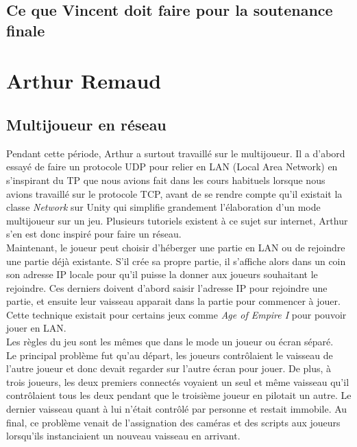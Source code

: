 \documentclass[10pt, titlepage]{report}
\begin{document}
\subsection{Ce que Vincent doit faire pour la soutenance finale}

\section{Arthur Remaud}

\subsection{Multijoueur en réseau}
Pendant cette période, Arthur a surtout travaillé sur le multijoueur. Il a d'abord essayé de faire un protocole UDP pour relier en LAN (Local Area Network) en s'inspirant du TP que nous avions fait dans les cours habituels lorsque nous avions travaillé sur le protocole TCP, avant de se rendre compte qu'il existait la classe \textit{Network} sur Unity qui simplifie grandement l'élaboration d'un mode multijoueur sur un jeu. Plusieurs tutoriels existent à ce sujet sur internet, Arthur s'en est donc inspiré pour faire un réseau.\\

Maintenant, le joueur peut choisir d'héberger une partie en LAN ou de rejoindre une partie déjà existante. S'il crée sa propre partie, il s'affiche alors dans un coin son adresse IP locale pour qu'il puisse la donner aux joueurs souhaitant le rejoindre. Ces derniers doivent d'abord saisir l'adresse IP pour rejoindre une partie, et ensuite leur vaisseau apparait dans la partie pour commencer à jouer. Cette technique existait pour certains jeux comme \textit{Age of Empire I} pour pouvoir jouer en LAN.\\

Les règles du jeu sont les mêmes que dans le mode un joueur ou écran séparé.\\

Le principal problème fut qu'au départ, les joueurs contrôlaient le vaisseau de l'autre joueur et donc devait regarder sur l'autre écran pour jouer. De plus, à trois joueurs, les deux premiers connectés voyaient un seul et même vaisseau qu'il contrôlaient tous les deux pendant que le troisième joueur en pilotait un autre. Le dernier vaisseau quant à lui n'était contrôlé par personne et restait immobile. Au final, ce problème venait de l'assignation des caméras et des scripts aux joueurs lorsqu'ils instanciaient un nouveau vaisseau en arrivant.\\
\end{document}
